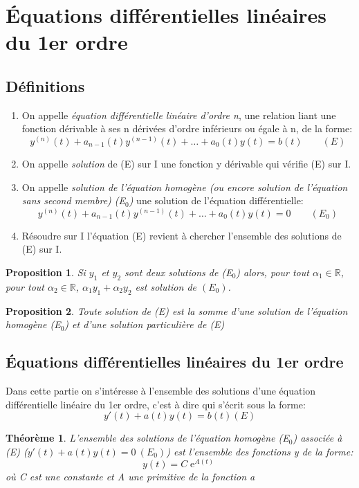 \documentclass[a4paper]{article}
\theoremstyle{break}
\newtheorem{theo}{Théorème}[section]
\newtheorem{prop}{Proposition}[section]
\DeclareMathOperator{\e}{e} %
\newcommand{\R}{\mathbb{R}}
\begin{document}
\section{Équations différentielles linéaires du 1er ordre}

\subsection{Définitions}
\begin{enumerate}[label=$\bullet$, leftmargin=2cm]
\item On appelle \emph{équation différentielle linéaire d'ordre n},
  une relation liant une fonction dérivable à ses n dérivées d'ordre
  inférieurs ou égale à n, de la forme:
  \[
    y^{(n)}(t) + a_{n-1}(t) y^{(n-1)}(t) + \dots + a_0(t) y(t) = b(t)
    \qquad (E)
  \]
\item On appelle \emph{solution} de (E) sur I une fonction y dérivable qui
  vérifie (E) sur I.
\item On appelle \emph{solution de l'équation homogène (ou encore
    solution de l'équation sans second membre) (E$_0$)} une solution de
  l'équation différentielle:
  \[
    y^{(n)}(t) + a_{n-1}(t) y^{(n-1)}(t) + \dots + a_0(t) y(t) = 0
    \qquad (E_0)
  \]
\item Résoudre sur I l'équation (E) revient à chercher l'ensemble des
  solutions de (E)
  sur I.
\end{enumerate}

\begin{prop}
  Si $y_1$ et $y_2$ sont deux solutions de (E$_0$) alors, pour tout
  $\alpha_1 \in \R$, pour tout $\alpha_2 \in \R$, $\alpha_1 y_1 +
  \alpha_2 y_2$ est solution de $(E_0)$.
\end{prop}

\begin{prop}
  Toute solution de (E) est la somme d'une solution de l'équation
  homogène (E$_0$) et d'une solution particulière de (E) 
\end{prop}

\subsection{Équations différentielles linéaires du 1er ordre}
Dans cette partie on s'intéresse à l'ensemble des solutions d'une
équation différentielle linéaire du 1er ordre, c'est à dire qui
s'écrit sous la forme:
\[
  y'(t) + a(t) y(t) = b(t) (E)
\]
\begin{theo}
  L'ensemble des solutions de l'équation homogène (E$_0$) associée à (E)
  ($y'(t) + a(t) y(t) = 0 ~ (E_0)$) est l'ensemble des fonctions y de
  la forme:
  \[
    y(t) = C \e^{A(t)}
  \]
  où C est une constante et A une primitive de la fonction a
\end{theo}
\end{document}
